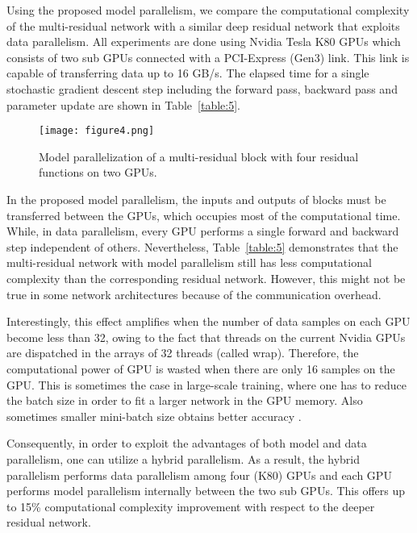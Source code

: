 \documentclass[journal]{IEEEtran}
\begin{document}
Using the proposed model parallelism, we compare the computational complexity of the multi-residual network with a similar deep residual network that exploits data parallelism. All experiments are done using Nvidia Tesla K80 GPUs which consists of two sub GPUs connected with a PCI-Express (Gen3) link. This link is capable of transferring data up to 16 GB/s. The elapsed time for a single stochastic gradient descent step including the forward pass, backward pass and parameter update are shown in Table~\ref{table:5}.

\begin{figure}[!htb]
\centering
\texttt{[image: figure4.png]}
\caption{Model parallelization of a multi-residual block with four residual functions on two GPUs.}
\label{fig:modelparallel}
\end{figure}


In the proposed model parallelism, the inputs and outputs of blocks must be  transferred between the GPUs, which occupies most of the computational time. While, in data parallelism, every GPU performs a single forward and backward step independent of others. Nevertheless, Table~\ref{table:5} demonstrates that the multi-residual network with model parallelism still has less computational complexity than the corresponding residual network. However, this might not be true in some network architectures because of the communication overhead.

Interestingly, this effect amplifies when the number of data samples on each GPU  become less than 32, owing to the fact that threads on the current Nvidia GPUs are dispatched in the arrays of 32 threads (called wrap). Therefore, the computational power of GPU is wasted when there are only 16 samples on the GPU. This is sometimes the case in large-scale training, where one has to reduce the batch size in order to fit a larger network in the GPU memory. Also sometimes smaller mini-batch size obtains better accuracy \cite{he2016identity}.

Consequently, in order to exploit the advantages of both model and data parallelism, one can utilize a hybrid parallelism. As a result, the hybrid parallelism performs data parallelism among four (K80) GPUs and each  GPU performs model parallelism internally between the two sub GPUs. This offers up to 15\% computational complexity improvement with respect to the deeper residual network.%
\end{document}
